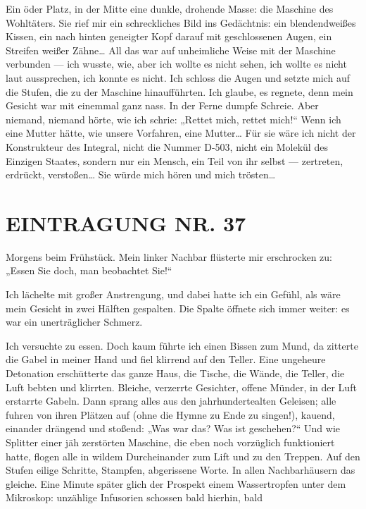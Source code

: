 Ein öder Platz, in der Mitte eine dunkle, drohende Masse: die
Maschine des Wohltäters. Sie rief mir ein schreckliches Bild ins
Gedächtnis: ein blendendweißes Kissen, ein nach hinten geneigter
Kopf darauf mit geschlossenen Augen, ein Streifen weißer Zähne\ldots{}
All das war auf unheimliche Weise mit der Maschine verbunden — ich
wusste, wie, aber ich wollte es nicht sehen, ich wollte es nicht
laut aussprechen, ich konnte es nicht. Ich schloss die Augen und
setzte mich auf die Stufen, die zu der Maschine hinaufführten. Ich
glaube, es regnete, denn mein Gesicht war mit einemmal ganz nass.
In der Ferne dumpfe Schreie. Aber niemand, niemand hörte, wie ich
schrie: „Rettet mich, rettet mich!“ Wenn ich eine Mutter hätte, wie
unsere Vorfahren, eine Mutter\ldots{} Für sie wäre ich nicht der
Konstrukteur des Integral, nicht die Nummer D-503, nicht ein
Molekül des Einzigen Staates, sondern nur ein Mensch, ein Teil von
ihr selbst — zertreten, erdrückt, verstoßen\ldots{} Sie würde mich hören
und mich trösten\ldots{}

\section{EINTRAGUNG NR. 37}

Morgens beim Frühstück. Mein linker Nachbar flüsterte mir
erschrocken zu: „Essen Sie doch, man beobachtet Sie!“

Ich lächelte mit großer Anstrengung, und dabei hatte ich ein
Gefühl, als wäre mein Gesicht in zwei Hälften gespalten. Die Spalte
öffnete sich immer weiter: es war ein unerträglicher Schmerz.

Ich versuchte zu essen. Doch kaum führte ich einen Bissen zum Mund,
da zitterte die Gabel in meiner Hand und fiel klirrend auf den
Teller. Eine ungeheure Detonation erschütterte das ganze Haus, die
Tische, die Wände, die Teller, die Luft bebten und klirrten.
Bleiche, verzerrte Gesichter, offene Münder, in der Luft erstarrte
Gabeln. Dann sprang alles aus den jahrhundertealten Geleisen; alle
fuhren von ihren Plätzen auf (ohne die Hymne zu Ende zu singen!),
kauend, einander drängend und stoßend: „Was war das? Was ist
geschehen?“ Und wie Splitter einer jäh zerstörten Maschine, die
eben noch vorzüglich funktioniert hatte, flogen alle in wildem
Durcheinander zum Lift und zu den Treppen. Auf den Stufen eilige
Schritte, Stampfen, abgerissene Worte. In allen Nachbarhäusern das
gleiche. Eine Minute später glich der Prospekt einem Wassertropfen
unter dem Mikroskop: unzählige Infusorien schossen bald hierhin,
bald


